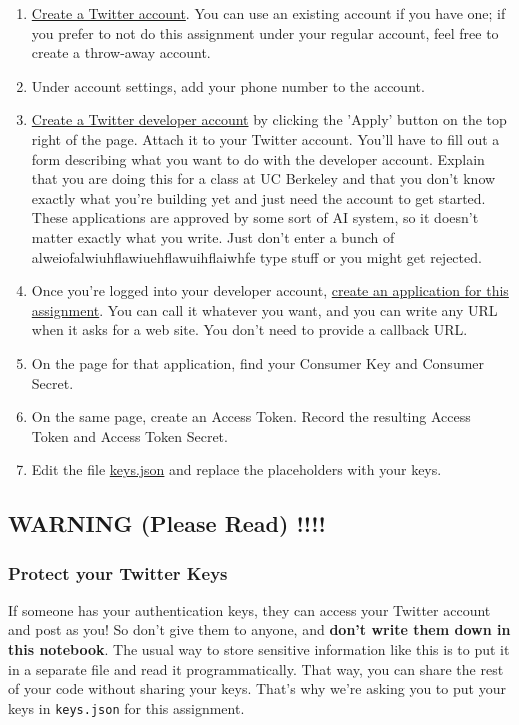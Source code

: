 \documentclass[11pt]{article}
\providecommand{\tightlist}{%
      \setlength{\itemsep}{0pt}\setlength{\parskip}{0pt}}
\begin{document}
\begin{enumerate}
\def\labelenumi{\arabic{enumi}.}
\tightlist
\item
  \href{https://twitter.com}{Create a Twitter account}. You can use an
  existing account if you have one; if you prefer to not do this
  assignment under your regular account, feel free to create a
  throw-away account.
\item
  Under account settings, add your phone number to the account.
\item
  \href{https://dev.twitter.com/resources/signup}{Create a Twitter
  developer account} by clicking the 'Apply' button on the top right of
  the page. Attach it to your Twitter account. You'll have to fill out a
  form describing what you want to do with the developer account.
  Explain that you are doing this for a class at UC Berkeley and that
  you don't know exactly what you're building yet and just need the
  account to get started. These applications are approved by some sort
  of AI system, so it doesn't matter exactly what you write. Just don't
  enter a bunch of alweiofalwiuhflawiuehflawuihflaiwhfe type stuff or
  you might get rejected.
\item
  Once you're logged into your developer account,
  \href{https://apps.twitter.com/app/new}{create an application for this
  assignment}. You can call it whatever you want, and you can write any
  URL when it asks for a web site. You don't need to provide a callback
  URL.
\item
  On the page for that application, find your Consumer Key and Consumer
  Secret.
\item
  On the same page, create an Access Token. Record the resulting Access
  Token and Access Token Secret.
\item
  Edit the file \url{keys.json} and replace the placeholders with your
  keys.
\end{enumerate}

    \subsection{WARNING (Please Read) !!!!}\label{warning-please-read}

\subsubsection{Protect your Twitter
Keys}\label{protect-your-twitter-keys}

{ If someone has your authentication keys, they can access your Twitter
account and post as you! So don't give them to anyone, and \textbf{don't
write them down in this notebook}. } The usual way to store sensitive
information like this is to put it in a separate file and read it
programmatically. That way, you can share the rest of your code without
sharing your keys. That's why we're asking you to put your keys in
\texttt{keys.json} for this assignment.
\end{document}
